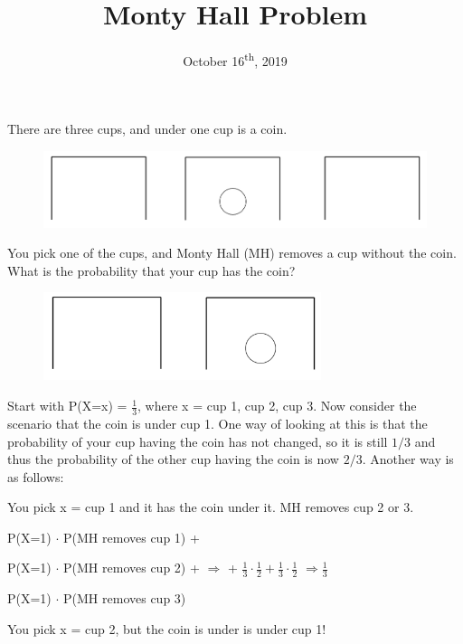 \documentclass[12pt, oneside,fullpage]{article}
\title{Monty Hall Problem}
\date{October 16\textsuperscript{th}, 2019}
\begin{document}
\maketitle

\noindent There are three cups, and under one cup is a coin.

\begin{figure}[ht]
	\includegraphics[width=5.0in, keepaspectratio]{Three_Cups.png}
\end{figure}


\noindent You pick one of the cups, and Monty Hall (MH) removes a cup without the coin. What is the probability that your cup has the coin?

\begin{figure}[ht]
	\includegraphics[width=3.2in, keepaspectratio]{Two_Cups.png}
\end{figure}


\noindent Start with P(X=x) = $\frac{1}{3}$, where x = cup 1, cup 2, cup 3. Now consider the scenario that the coin is under cup 1. One way of looking at this is that the probability of your cup having the coin has not changed, so it is still $1/3$ and thus the probability of the other cup having the coin is now $2/3$. Another way is as follows:

\bigskip

\noindent You pick x = cup 1 and it has the coin under it. MH removes cup 2 or 3.

P(X=1) $\cdot$ P(MH removes cup 1) +

P(X=1) $\cdot$ P(MH removes cup 2) + \indent  $\Rightarrow$  + $\frac{1}{3} \cdot \frac{1}{2} + \frac{1}{3} \cdot \frac{1}{2}$ $\Rightarrow \frac{1}{3}$

P(X=1) $\cdot$ P(MH removes cup 3)

\bigskip

\noindent You pick x = cup 2, but the coin is under is under cup 1!
\end{document}
